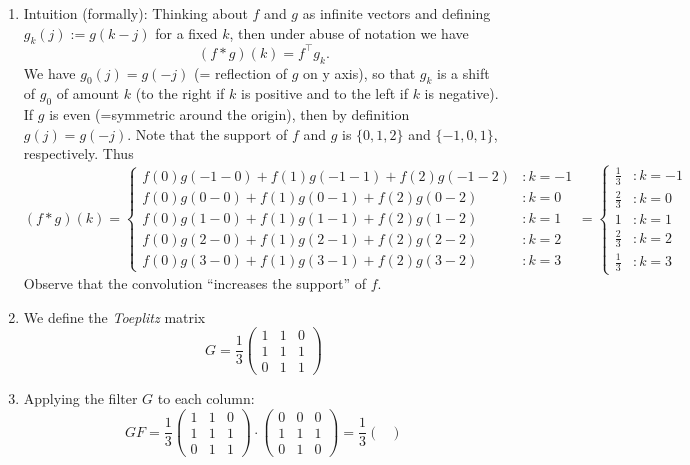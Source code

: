 \begin{enumerate}
	\item  {\color{navy} Intuition (formally): Thinking about $f$ and $g$ as infinite vectors and defining $g_k(j):= g(k-j)$ for a fixed $k$, then under abuse of notation we have 
		$$(f\ast g)(k) = f^\top g_k. $$
	We have $g_0(j) = g(-j)$ (= reflection of $g$ on y axis), so that $g_k$ is a shift of $g_0$ of amount $k$ (to the right if $k$ is positive and to the left if $k$ is negative). If $g$ is even (=symmetric around the origin), then by definition $g(j)=g(-j)$.
  }
	Note that the support of $f$  and $g$ is $\{0,1,2\}$ and $\{-1,0,1\}$, respectively. Thus
	$$
	(f \ast g)(k) =
	\begin{cases}
	f(0)g(-1-0) + f(1)g(-1-1) + f(2)g(-1-2) & : k = -1 \\
	f(0)g(0-0) + f(1)g(0-1) + f(2)g(0-2) & : k = 0 \\
	f(0)g(1-0) + f(1)g(1-1) + f(2)g(1-2) & : k = 1 \\
	f(0)g(2-0) + f(1)g(2-1) + f(2)g(2-2) & : k = 2 \\
	f(0)g(3-0) + f(1)g(3-1) + f(2)g(3-2) & : k = 3 
	\end{cases} =
	\begin{cases}
	\tfrac{1}{3}  & : k = -1 \\
	\tfrac{2}{3}  & : k = 0 \\
	1  & : k = 1 \\
	\tfrac{2}{3}  & : k = 2 \\
	\tfrac{1}{3}  & : k = 3 
	\end{cases}
	$$
	Observe that the convolution ``increases the support'' of $f$.
	\item We define the \textit{Toeplitz} matrix
	$$
	G = 
	\frac{1}{3}
	\begin{pmatrix}
		1&1&0 \\
		1&1&1 \\
		0&1&1
	\end{pmatrix}
	$$
	\item Applying the filter $G$ to each column:
	$$GF = 
		\frac{1}{3}
	\begin{pmatrix}
	1&1&0 \\
	1&1&1 \\
	0&1&1
	\end{pmatrix}
	\cdot 
	\begin{pmatrix}
	0 & 0 & 0\\1 & 1 & 1\\ 0 & 1 & 0
	\end{pmatrix} 
	=
	 \frac{1}{3}
	\begin{pmatrix}

\end{pmatrix}$$
\end{enumerate}

